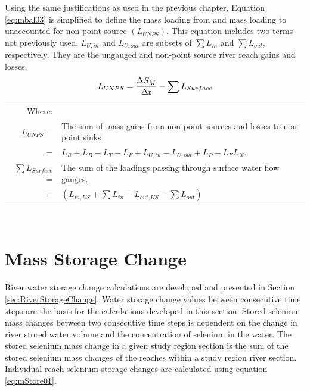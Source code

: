 \begin{linenumbers}
Using the same justifications as used in the previous chapter, Equation \ref{eq:mbal03} is simplified to define the mass loading from and mass loading to unaccounted for non-point source $\left( L_{UNPS} \right) $.  This equation includes two terms not previously used.  $ L_{U,in} $ and $ L_{U,out} $ are subsets of $\displaystyle \sum L_{in} $ and $ \displaystyle \sum L_{out} $, respectively.  They are the ungauged and non-point source river reach gains and losses.
\begin{equation}
	\label{eq:mbal04}
	L_{UNPS} = \frac{\Delta S_M}{\Delta t} - \sum L_{Surface}\\ 
\end{equation}
\begin{tabular}{r p{5.5in}}
	Where: \\
	$ L_{UNPS} $ = & The sum of mass gains from non-point sources and losses to non-point sinks \\
		= &$ L_R + L_B - L_T -L_ F + L_{U,in} - L_{U,out} + L_P - L_E  L_X$.\\ 
	$ \sum L_{Surface} $ = & The sum of the loadings passing through surface water flow gauges.\\
		= & $ \left( L_{in,US} + \sum L_{in} - L_{out,US} - \sum L_{out} \right)  $\\
\end{tabular}\\

\section{Mass Storage Change}
\label{sec:MassStorageChange}

River water storage change calculations are developed and presented in Section \ref{sec:RiverStorageChange}.  Water storage change values between consecutive time steps are the basis for the calculations developed in this section.  Stored selenium mass changes between two consecutive time steps is dependent on the change in river stored water volume and the concentration of selenium in the water.  The stored selenium mass change in a given study region section is the sum of the stored selenium mass changes of the reaches within a study region river section.  Individual reach selenium storage changes are calculated using equation \ref{eq:mStore01}.


\end{linenumbers}
